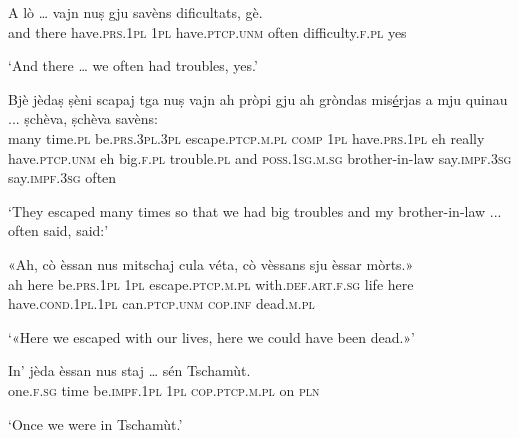 \begin{linenumbers}
\gll  A lò … vajn nuṣ gju savèns dificultats, gè.  \\
and there {} have.\textsc{prs.1pl} \textsc{1pl} have.\textsc{ptcp.unm} often difficulty.\textsc{f.pl} yes\\
\end{linenumbers}
\medskip
\glt `And there … we often had troubles, yes.'
\medskip

\begin{linenumbers}
\gll  Bjè jèdaṣ ṣèni scapaj tga nuṣ vajn ah pròpi gju ah gròndas mis\underline{é}rjas a mju quinau ... ṣchèva, ṣchèva savèns:\\
many time.\textsc{pl} be.\textsc{prs.3pl.3pl} escape.\textsc{ptcp.m.pl} \textsc{comp} \textsc{1pl}   have.\textsc{prs.1pl} eh really have.\textsc{ptcp.unm} eh big.\textsc{f.pl} trouble.\textsc{pl} and \textsc{poss.1sg.m.sg}  brother-in-law {} say.\textsc{impf.3sg} say.\textsc{impf.3sg} often\\
\end{linenumbers}
\medskip
\glt `They escaped many times so that we had big troubles and my brother-in-law ... often said, said:'
\medskip

\begin{linenumbers}
\gll «Ah, cò èssan nus mitschaj cula véta, cò vèssans sju èssar mòrts.»\\
ah here be.\textsc{prs.1pl} \textsc{1pl} escape.\textsc{ptcp.m.pl} with.\textsc{def.art.f.sg} life here have.\textsc{cond.1pl.1pl} can.\textsc{ptcp.unm} \textsc{cop.inf} dead.\textsc{m.pl}\\
\end{linenumbers}
\medskip
\glt `«Here we escaped with our lives, here we could have been dead.»'
\medskip

\begin{linenumbers}
\gll   In’ jèda èssan nus staj … sén Tschamùt. \\
 one.\textsc{f.sg} time be.\textsc{impf.1pl} \textsc{1pl} \textsc{cop.ptcp.m.pl} {} on \textsc{pln} \\
\end{linenumbers}
\medskip
\glt `Once we were in Tschamùt.'
\medskip

